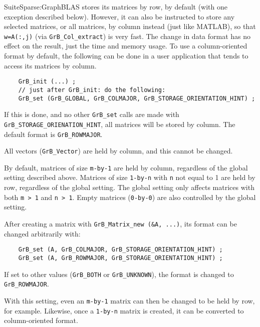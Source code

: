 SuiteSparse:GraphBLAS stores its matrices by row, by default (with one
exception described below).  However, it can also be instructed to store any
selected matrices, or all matrices, by column instead (just like MATLAB), so
that \verb'w=A(:,j)' (via \verb'GrB_Col_extract') is very fast.  The change in
data format has no effect on the result, just the time and memory usage.  To
use a column-oriented format by default, the following can be done in a user
application that tends to access its matrices by column.

    {\footnotesize
    \begin{verbatim}
    GrB_init (...) ;
    // just after GrB_init: do the following:
    GrB_set (GrB_GLOBAL, GrB_COLMAJOR, GrB_STORAGE_ORIENTATION_HINT) ; \end{verbatim} }

If this is done, and no other \verb'GrB_set' calls are made with \newline
\verb'GrB_STORAGE_ORIENATION_HINT', all matrices will be stored by column.
The default format is \verb'GrB_ROWMAJOR'.

All vectors (\verb'GrB_Vector') are held by column, and this cannot be changed.

By default, matrices of size \verb'm-by-1' are held by column, regardless of
the global setting described above.  Matrices of size \verb'1-by-n' with
\verb'n' not equal to 1 are held by row, regardless of the global setting.
The global setting only affects matrices with both \verb'm > 1' and \verb'n > 1'.
Empty matrices (\verb'0-by-0') are also controlled by the global setting.

After creating a matrix with \verb'GrB_Matrix_new (&A, ...)',
its format can be changed arbitrarily with:

    {\footnotesize
    \begin{verbatim}
    GrB_set (A, GrB_COLMAJOR, GrB_STORAGE_ORIENTATION_HINT) ;
    GrB_set (A, GrB_ROWMAJOR, GrB_STORAGE_ORIENTATION_HINT) ; \end{verbatim} }

If set to other values (\verb'GrB_BOTH' or \verb'GrB_UNKNOWN'), the
format is changed to \verb'GrB_ROWMAJOR'.

With this setting, even an \verb'm-by-1' matrix can then be changed to be held
by row, for example.  Likewise, once a \verb'1-by-n' matrix is created, it can
be converted to column-oriented format.


